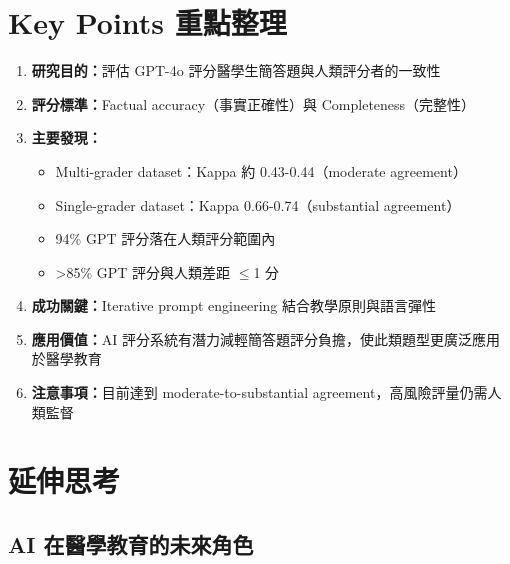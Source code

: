 \documentclass[12pt,a4paper]{article}
\begin{document}
\section{Key Points 重點整理}

\begin{importantbox}
\begin{enumerate}[leftmargin=2em]
    \item \textbf{研究目的：}評估 GPT-4o 評分醫學生簡答題與人類評分者的一致性

    \item \textbf{評分標準：}Factual accuracy（事實正確性）與 Completeness（完整性）

    \item \textbf{主要發現：}
    \begin{itemize}
        \item Multi-grader dataset：Kappa 約 0.43-0.44（moderate agreement）
        \item Single-grader dataset：Kappa 0.66-0.74（substantial agreement）
        \item 94\% GPT 評分落在人類評分範圍內
        \item >85\% GPT 評分與人類差距 $\leq$1 分
    \end{itemize}

    \item \textbf{成功關鍵：}Iterative prompt engineering 結合教學原則與語言彈性

    \item \textbf{應用價值：}AI 評分系統有潛力減輕簡答題評分負擔，使此類題型更廣泛應用於醫學教育

    \item \textbf{注意事項：}目前達到 moderate-to-substantial agreement，高風險評量仍需人類監督
\end{enumerate}
\end{importantbox}

\section{延伸思考}

\subsection{AI 在醫學教育的未來角色}
\end{document}
